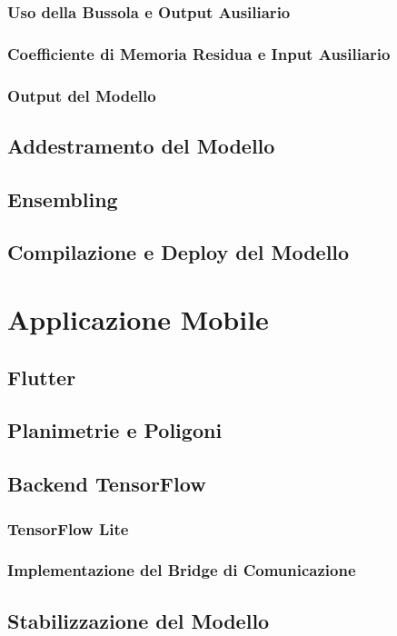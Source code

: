 \documentclass[12pt]{report}
\begin{document}
\subsection{Uso della Bussola e Output Ausiliario}
\subsection{Coefficiente di Memoria Residua e Input Ausiliario}
\subsection{Output del Modello}
\section{Addestramento del Modello}
\section{Ensembling}
\section{Compilazione e Deploy del Modello}

\chapter{Applicazione Mobile}
\section{Flutter}
\section{Planimetrie e Poligoni}
\section{Backend TensorFlow}
\subsection{TensorFlow Lite}
\subsection{Implementazione del Bridge di Comunicazione}
\section{Stabilizzazione del Modello}
\end{document}
